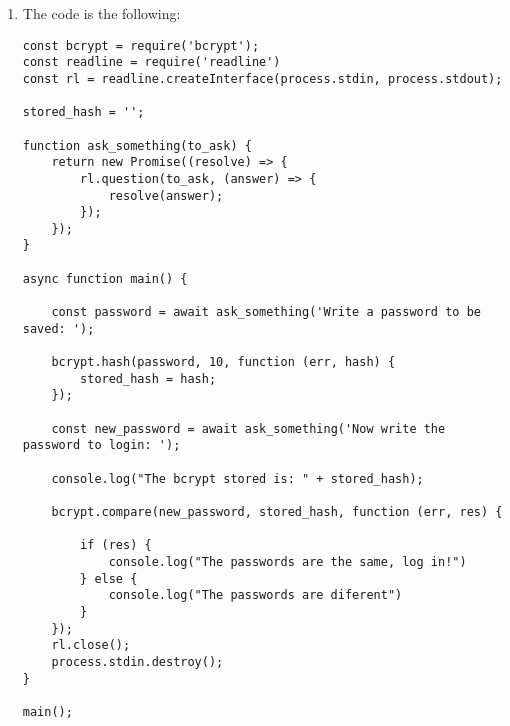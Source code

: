 \begin{Answer}[ref={basic-js-crypto-bcrypt}]
\begin{enumerate}[1.]
\item The code is the following: 

\begin{lstlisting}[style=JavaScript]
const bcrypt = require('bcrypt');
const readline = require('readline')
const rl = readline.createInterface(process.stdin, process.stdout);

stored_hash = '';

function ask_something(to_ask) {
    return new Promise((resolve) => {
        rl.question(to_ask, (answer) => {
            resolve(answer);
        });
    });
}

async function main() {

    const password = await ask_something('Write a password to be saved: ');

    bcrypt.hash(password, 10, function (err, hash) {
        stored_hash = hash;
    });

    const new_password = await ask_something('Now write the password to login: ');

    console.log("The bcrypt stored is: " + stored_hash);

    bcrypt.compare(new_password, stored_hash, function (err, res) {

        if (res) {
            console.log("The passwords are the same, log in!")
        } else {
            console.log("The passwords are diferent")
        }
    });
    rl.close();
    process.stdin.destroy();
}

main();
\end{lstlisting}
\end{enumerate}
\end{Answer}
